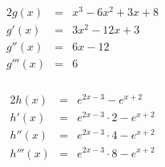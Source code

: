 \documentclass[10pt,a4paper,oneside,ngerman,numbers=noenddot]{scrartcl}
\begin{document}
\subsubsection{} %
\begin{alignat*}{2}
g(x) &=& x^{3} - 6x^{2} + 3x + 8 \\
g'(x) &=& 3x^{2} - 12x + 3 \\
g''(x) &=& 6x - 12 \\
g'''(x) &=& 6
\end{alignat*}
\subsubsection{} %
\begin{alignat*}{2}
h(x) &=& e^{2x-3} - e^{x+2} \\
h'(x) &=& e^{2x-3} \cdot 2 -  e^{x+2} \\
h''(x) &=& e^{2x-3} \cdot 4 -  e^{x+2} \\
h'''(x) &=& e^{2x-3} \cdot 8 -  e^{x+2}
\end{alignat*}
\end{document}
